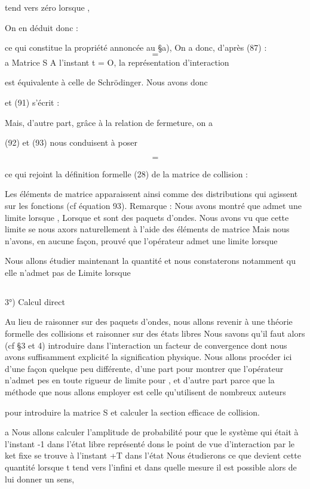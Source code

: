 tend vers zéro lorsque ,

On en déduit donc :

ce qui constitue la propriété annoncée au \S a),
On a donc, d'après (87) :
\[
\tag{91}=
\]
a Matrice S
A l'instant t = O, la représentation d'interaction

est équivalente à celle de Schrödinger. Nous avons donc

et (91) s'écrit :

Mais, d'autre part, grâce à la relation de fermeture, on a


(92) et (93) nous conduisent à poser

\[
\tag{94}=
\]

ce qui rejoint la définition formelle (28) de la matrice de collision :

Les éléments de matrice  apparaissent ainsi comme des distributions
qui agissent sur les fonctions (cf équation 93).
Remarque : 
Nous avons montré que  admet une limite lorsque
, Lorsque  et  sont des paquets d'ondes.
Nous avons vu que cette limite se nous axors naturellement à l'aide
des éléments de matrice
Mais nous n'avons, en aucune façon, prouvé que l'opérateur 
admet une limite lorsque 

Nous allons étudier maintenant la quantité
et nous constaterons notamment qu elle n'admet pas de Limite lorsque

\subsection{}%
3°) Calcul direct 

Au lieu de raisonner sur des paquets d'ondes, nous allons revenir
à une théorie formelle des collisions et raisonner sur des états libres
Nous savons qu'il faut alors (cf \S 3 et 4) introduire dans l'interaction un
facteur de convergence dont nous avons suffisamment explicité la signification
physique. Nous allons procéder ici d'une façon quelque peu différente,
d'une part pour montrer que l'opérateur  n'admet pes en toute rigueur de limite
pour , et d'autre part parce que la
méthode que nous allons employer est celle qu'utilisent de nombreux auteurs

pour introduire la matrice S et calculer la section efficace de collision.


a Nous allons calculer l'amplitude de probabilité
 pour que le système qui était à l'instant -1 dans l'état libre représenté dons
 le point de vue d'interaction par le ket fixe  se trouve à l'instant +T dans
l'état Nous étudierons ce que devient cette quantité lorsque t tend vers
l'infini et dans quelle mesure il est possible alors
de lui donner un sens,

